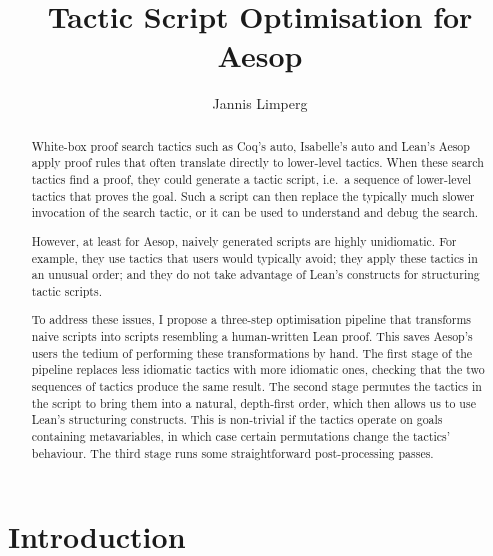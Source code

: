 \documentclass[sigplan,10pt,anonymous,review]{acmart}
\begin{document}
\begin{abstract}
  White-box proof search tactics such as Coq's auto, Isabelle's auto and Lean's Aesop apply proof rules that often translate directly to lower-level tactics.
  When these search tactics find a proof, they could generate a tactic script, i.e.\ a sequence of lower-level tactics that proves the goal.
  Such a script can then replace the typically much slower invocation of the search tactic, or it can be used to understand and debug the search.

  However, at least for Aesop, naively generated scripts are highly unidiomatic.
  For example, they use tactics that users would typically avoid; they apply these tactics in an unusual order; and they do not take advantage of Lean's constructs for structuring tactic scripts.

  To address these issues, I propose a three-step optimisation pipeline that transforms naive scripts into scripts resembling a human-written Lean proof.
  This saves Aesop's users the tedium of performing these transformations by hand.
  The first stage of the pipeline replaces less idiomatic tactics with more idiomatic ones, checking that the two sequences of tactics produce the same result.
  The second stage permutes the tactics in the script to bring them into a natural, depth-first order, which then allows us to use Lean's structuring constructs.
  This is non-trivial if the tactics operate on goals containing metavariables, in which case certain permutations change the tactics' behaviour.
  The third stage runs some straightforward post-processing passes.
\end{abstract}

\title{Tactic Script Optimisation for Aesop}

\author{Jannis Limperg}

\maketitle

\section{Introduction}%
\label{sec:intro}
\end{document}
